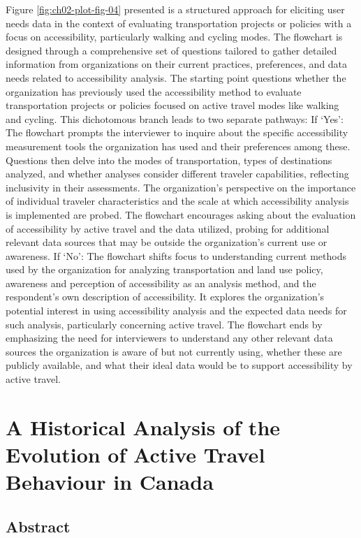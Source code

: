 \documentclass[
11pt, %
oneside, %
english, %
singlespacing, %
]{macthesis} %
\begin{document}
Figure \ref{fig:ch02-plot-fig-04} presented is a structured approach for eliciting user needs data in the context of evaluating transportation projects or policies with a focus on accessibility, particularly walking and cycling modes. The flowchart is designed through a comprehensive set of questions tailored to gather detailed information from organizations on their current practices, preferences, and data needs related to accessibility analysis. The starting point questions whether the organization has previously used the accessibility method to evaluate transportation projects or policies focused on active travel modes like walking and cycling. This dichotomous branch leads to two separate pathways:
If `Yes':
The flowchart prompts the interviewer to inquire about the specific accessibility measurement tools the organization has used and their preferences among these.
Questions then delve into the modes of transportation, types of destinations analyzed, and whether analyses consider different traveler capabilities, reflecting inclusivity in their assessments.
The organization's perspective on the importance of individual traveler characteristics and the scale at which accessibility analysis is implemented are probed.
The flowchart encourages asking about the evaluation of accessibility by active travel and the data utilized, probing for additional relevant data sources that may be outside the organization's current use or awareness.
If `No':
The flowchart shifts focus to understanding current methods used by the organization for analyzing transportation and land use policy, awareness and perception of accessibility as an analysis method, and the respondent's own description of accessibility.
It explores the organization's potential interest in using accessibility analysis and the expected data needs for such analysis, particularly concerning active travel.
The flowchart ends by emphasizing the need for interviewers to understand any other relevant data sources the organization is aware of but not currently using, whether these are publicly available, and what their ideal data would be to support accessibility by active travel.

\chapter{A Historical Analysis of the Evolution of Active Travel Behaviour in Canada}\label{math-sci}

\section{Abstract}\label{abstract-1}
\end{document}
